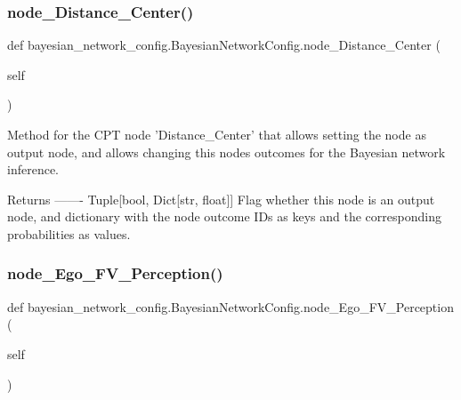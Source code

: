 \subsubsection{\texorpdfstring{node\+\_\+\+Distance\+\_\+\+Center()}{node\_Distance\_Center()}\hspace{0.1cm}{\footnotesize\ttfamily [2/2]}}
{\footnotesize\ttfamily def bayesian\+\_\+network\+\_\+config.\+Bayesian\+Network\+Config.\+node\+\_\+\+Distance\+\_\+\+Center (\begin{DoxyParamCaption}\item[{}]{self }\end{DoxyParamCaption})}

\begin{DoxyVerb}Method for the CPT node 'Distance_Center' that allows setting the node as output node, 
and allows changing this nodes outcomes for the Bayesian network inference.

Returns
-------
Tuple[bool, Dict[str, float]]
    Flag whether this node is an output node, and dictionary with the node outcome IDs as keys 
    and the corresponding probabilities as values.
\end{DoxyVerb}
 \mbox{\label{classbayesian__network__config_1_1_bayesian_network_config_aff3733f4b57dcb4c4cbc0184ea07c133}} 
\subsubsection{\texorpdfstring{node\+\_\+\+Ego\+\_\+\+F\+V\+\_\+\+Perception()}{node\_Ego\_FV\_Perception()}\hspace{0.1cm}{\footnotesize\ttfamily [1/3]}}
{\footnotesize\ttfamily def bayesian\+\_\+network\+\_\+config.\+Bayesian\+Network\+Config.\+node\+\_\+\+Ego\+\_\+\+F\+V\+\_\+\+Perception (\begin{DoxyParamCaption}\item[{}]{self }\end{DoxyParamCaption})}

